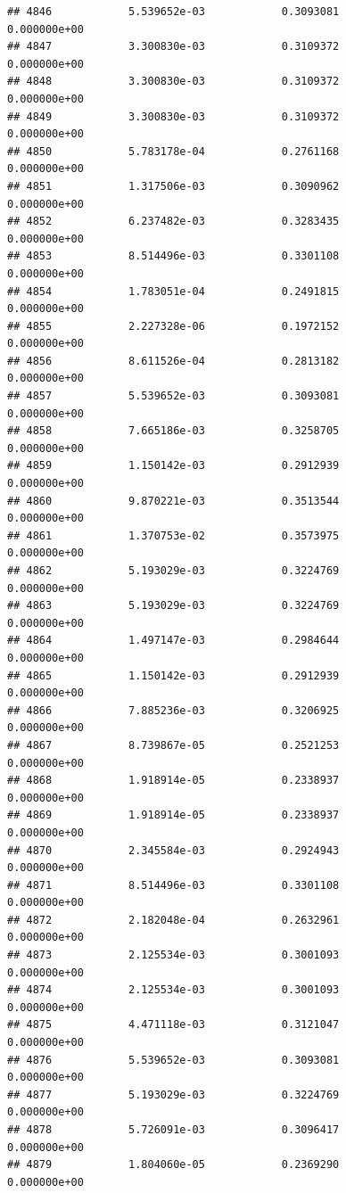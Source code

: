 \documentclass[
]{article}
\begin{document}
\begin{verbatim}
## 4846            5.539652e-03            0.3093081            0.000000e+00
## 4847            3.300830e-03            0.3109372            0.000000e+00
## 4848            3.300830e-03            0.3109372            0.000000e+00
## 4849            3.300830e-03            0.3109372            0.000000e+00
## 4850            5.783178e-04            0.2761168            0.000000e+00
## 4851            1.317506e-03            0.3090962            0.000000e+00
## 4852            6.237482e-03            0.3283435            0.000000e+00
## 4853            8.514496e-03            0.3301108            0.000000e+00
## 4854            1.783051e-04            0.2491815            0.000000e+00
## 4855            2.227328e-06            0.1972152            0.000000e+00
## 4856            8.611526e-04            0.2813182            0.000000e+00
## 4857            5.539652e-03            0.3093081            0.000000e+00
## 4858            7.665186e-03            0.3258705            0.000000e+00
## 4859            1.150142e-03            0.2912939            0.000000e+00
## 4860            9.870221e-03            0.3513544            0.000000e+00
## 4861            1.370753e-02            0.3573975            0.000000e+00
## 4862            5.193029e-03            0.3224769            0.000000e+00
## 4863            5.193029e-03            0.3224769            0.000000e+00
## 4864            1.497147e-03            0.2984644            0.000000e+00
## 4865            1.150142e-03            0.2912939            0.000000e+00
## 4866            7.885236e-03            0.3206925            0.000000e+00
## 4867            8.739867e-05            0.2521253            0.000000e+00
## 4868            1.918914e-05            0.2338937            0.000000e+00
## 4869            1.918914e-05            0.2338937            0.000000e+00
## 4870            2.345584e-03            0.2924943            0.000000e+00
## 4871            8.514496e-03            0.3301108            0.000000e+00
## 4872            2.182048e-04            0.2632961            0.000000e+00
## 4873            2.125534e-03            0.3001093            0.000000e+00
## 4874            2.125534e-03            0.3001093            0.000000e+00
## 4875            4.471118e-03            0.3121047            0.000000e+00
## 4876            5.539652e-03            0.3093081            0.000000e+00
## 4877            5.193029e-03            0.3224769            0.000000e+00
## 4878            5.726091e-03            0.3096417            0.000000e+00
## 4879            1.804060e-05            0.2369290            0.000000e+00

\end{verbatim}
\end{document}
